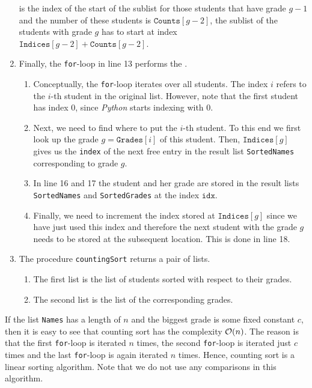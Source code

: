 \begin{enumerate}
      is the index of the start of the sublist for those students that have grade $g-1$ and the number of these
      students is $\texttt{Counts}[g-2]$, the sublist of the students with grade $g$ has to start at index
      \\[0.2cm]
      \hspace*{1.3cm}
      $\texttt{Indices}[g-2] + \texttt{Counts}[g-2]$.
\item Finally, the \texttt{for}-loop in line 13 performs the .
      \begin{enumerate}
      \item Conceptually, the \texttt{for}-loop iterates over all students. The index $i$ refers to the $i$-th
            student in the original list.  However, note that the first student has index $0$, since
            \textsl{Python} starts indexing with $0$.
      \item Next, we need to find where to put the $i$-th student.  To this end we first look up the
            grade $g = \texttt{Grades}[i]$ of this student.  Then, $\texttt{Indices}[g]$ gives us
            the \texttt{index} of the next free entry in the result list \texttt{SortedNames} corresponding to grade $g$.
      \item In line 16 and 17 the student and her grade are stored in the result lists \texttt{SortedNames}
            and \texttt{SortedGrades} at the index $\texttt{idx}$.
      \item Finally, we need to increment the index stored at $\texttt{Indices}[g]$ since we have just used
            this index and therefore the next student with the grade $g$ needs to be stored at the subsequent location.
            This is done in line 18.
      \end{enumerate}
\item The procedure \texttt{countingSort} returns a pair of lists.
      \begin{enumerate}
      \item The first list is the list of students sorted with respect to their grades.
      \item The second list is the list of the corresponding grades.
      \end{enumerate}
\end{enumerate}
If the list \texttt{Names} has a length of $n$ and the biggest grade is some fixed constant $c$, then it is easy to
see that counting sort has the complexity $\mathcal{O}(n)$.  The reason is that the first \texttt{for}-loop is iterated
$n$ times, the second \texttt{for}-loop is iterated just $c$ times and the last \texttt{for}-loop is again
iterated $n$ times.  Hence, counting sort is a linear sorting algorithm.  Note that we do not use any
comparisons in this algorithm.

